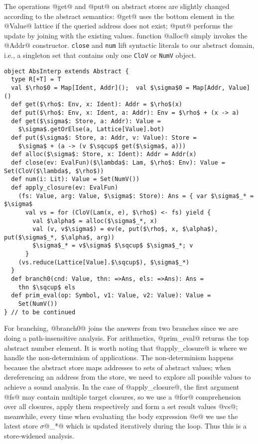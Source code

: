 The operations @get@ and @put@ on abstract stores are slightly changed according
to the abstract semantics: @get@ uses the bottom element in the @Value@ lattice
if the queried address does not exist; @put@ performs the update by joining with
the existing values. function @alloc@ simply invokes the @Addr@ constructor.
\texttt{close} and \texttt{num} lift syntactic literals to our abstract domain,
i.e., a singleton set that contains only one \texttt{CloV} or \texttt{NumV}
object.

\begin{lstlisting}
object AbsInterp extends Abstract {
  type R[+T] = T
  val $\rho$0 = Map[Ident, Addr]();  val $\sigma$0 = Map[Addr, Value]()
  def get($\rho$: Env, x: Ident): Addr = $\rho$(x)
  def put($\rho$: Env, x: Ident, a: Addr): Env = $\rho$ + (x -> a)
  def get($\sigma$: Store, a: Addr): Value = 
    $\sigma$.getOrElse(a, Lattice[Value].bot)
  def put($\sigma$: Store, a: Addr, v: Value): Store =
    $\sigma$ + (a -> (v $\sqcup$ get($\sigma$, a)))
  def alloc($\sigma$: Store, x: Ident): Addr = Addr(x)
  def close(ev: EvalFun)($\lambda$: Lam, $\rho$: Env): Value = Set(CloV($\lambda$, $\rho$))
  def num(i: Lit): Value = Set(NumV())
  def apply_closure(ev: EvalFun)
    (fs: Value, arg: Value, $\sigma$: Store): Ans = { var $\sigma$_* = $\sigma$
      val vs = for (CloV(Lam(x, e), $\rho$) <- fs) yield {
        val $\alpha$ = alloc($\sigma$_*, x)
        val (v, v$\sigma$) = ev(e, put($\rho$, x, $\alpha$), put($\sigma$_*, $\alpha$, arg))
        $\sigma$_* = v$\sigma$ $\sqcup$ $\sigma$_*; v
      }
    (vs.reduce(Lattice[Value].$\sqcup$), $\sigma$_*)
  }
  def branch0(cnd: Value, thn: =>Ans, els: =>Ans): Ans = 
    thn $\sqcup$ els
  def prim_eval(op: Symbol, v1: Value, v2: Value): Value = 
    Set(NumV())
} // to be continued
\end{lstlisting}

For branching, @branch0@ joins the answers from two branches since we are doing
a path-insensitive analysis. For arithmetics, @prim_eval@ returns the top
abstract number element. It is worth noting that @apply_closure@ is where we
handle the non-determinism of applications. The non-determinism happens because
the abstract store maps addresses to sets of abstract values; when dereferencing
an address from the store, we need to explore all possible values to achieve a
sound analysis. In the case of @apply_closure@, the first argument @fs@ may
contain multiple target closures, so we use a @for@ comprehension over all
closures, apply them respectively and form a set result values @vs@; meanwhile,
every time when evaluating the body expression @e@ we use the latest store
$\sigma$@_*@ which is updated iteratively during the loop. Thus this is a
store-widened analysis.

